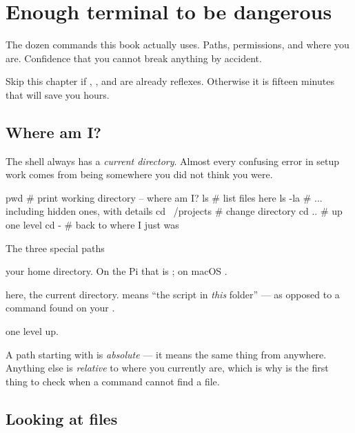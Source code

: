 \chapter{Enough terminal to be dangerous}
\label{ch:terminal}

\chapterbrief
  {The dozen commands this book actually uses.}
  {Paths, permissions, and where you are.}
  {Confidence that you cannot break anything by accident.}

Skip this chapter if , ,  and  are
already reflexes. Otherwise it is fifteen minutes that will save you hours.

\section{Where am I?}

The shell always has a \emph{current directory}. Almost every confusing error in
setup work comes from being somewhere you did not think you were.

\begin{shell}
pwd                 # print working directory -- where am I?
ls                  # list files here
ls -la              # ... including hidden ones, with details
cd ~/projects       # change directory
cd ..               # up one level
cd -                # back to where I just was
\end{shell}

\begin{concept}{The three special paths}
\begin{description}[leftmargin=0pt, style=nextline]
  \item[\code{\textasciitilde}] your home directory. On the Pi that is
        ; on macOS .
  \item[\code{.}] here, the current directory.  means ``the
        script in \emph{this} folder'' --- as opposed to a command found on your
        .
  \item[\code{..}] one level up.
\end{description}

A path starting with \code{/} is \emph{absolute} --- it means the same thing from
anywhere. Anything else is \emph{relative} to where you currently are, which is
why  is the first thing to check when a command cannot find a file.
\end{concept}

\section{Looking at files}

